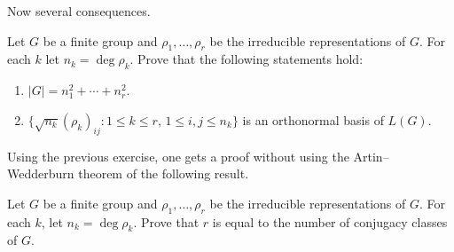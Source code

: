 Now several consequences. 

\begin{exercise}
    Let $G$ be a finite group and $\rho_1,\dots,\rho_r$ be the irreducible representations of $G$. 
    For each $k$ let $n_k=\deg\rho_k$. Prove that the following statements hold:
    \begin{enumerate}
        \item $|G|=n_1^2+\cdots+n_r^2$.
        \item $\{\sqrt{n_k}(\rho_k)_{ij}:1\leq k\leq r,\,1\leq i,j\leq n_k\}$
            is an orthonormal basis of $L(G)$. 
    \end{enumerate}
\end{exercise}

Using the previous exercise, one gets a proof without using the Artin--Wedderburn theorem 
of  the following result.

\begin{bonus}
    Let $G$ be a finite group and $\rho_1,\dots,\rho_r$ be the irreducible representations of $G$. 
    For each $k$, let $n_k=\deg\rho_k$. Prove that 
    $r$ is equal to the number of conjugacy classes of $G$. 
\end{bonus}


